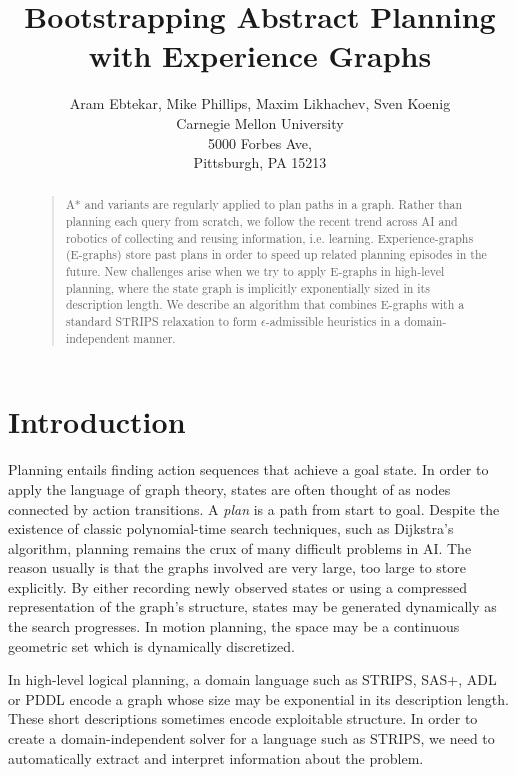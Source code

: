 \documentclass[letterpaper]{article}
\begin{document}
%
\title{Bootstrapping Abstract Planning with Experience Graphs}
\author{Aram Ebtekar, Mike Phillips, Maxim Likhachev, Sven Koenig\\
Carnegie Mellon University\\
5000 Forbes Ave,\\
Pittsburgh, PA 15213\\
}
\maketitle
\begin{abstract}
\begin{quote}
A* and variants are regularly applied to plan paths in a graph. Rather than planning each query from scratch, we follow the recent trend across AI and robotics of collecting and reusing information, i.e. learning. Experience-graphs (E-graphs) store past plans in order to speed up related planning episodes in the future. New challenges arise when we try to apply E-graphs in high-level planning, where the state graph is implicitly exponentially sized in its description length. We describe an algorithm that combines E-graphs with a standard STRIPS relaxation to form $\epsilon$-admissible heuristics in a domain-independent manner.
\end{quote}
\end{abstract}

\section{Introduction}
Planning entails finding action sequences that achieve a goal state.
In order to apply the language of graph theory, states are often thought of as nodes connected by action transitions.
A \textit{plan} is a path from start to goal.
Despite the existence of classic polynomial-time search techniques, such as Dijkstra's algorithm, planning remains the crux of many difficult problems in AI.
The reason usually is that the graphs involved are very large, too large to store explicitly.
By either recording newly observed states or using a compressed representation of the graph's structure, states may be generated dynamically as the search progresses.
In motion planning, the space may be a continuous geometric set which is dynamically discretized.

In high-level logical planning, a domain language such as STRIPS, SAS+, ADL or PDDL encode a graph whose size may be exponential in its description length. 
These short descriptions sometimes encode exploitable structure.
In order to create a domain-independent solver for a language such as STRIPS, we need to automatically extract and interpret information about the problem. 
\end{document}
